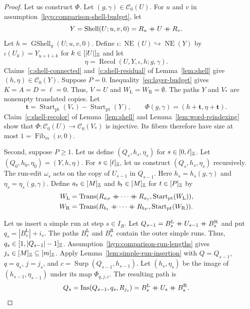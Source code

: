 \begin{proof}
 Let us construct $\Phi$.
Let $(g,\gamma)\in\mathcal C_0(U)$.
For $u$ and $v$ in assumption~\ref{hyp:comparison-shell-budget}, let
\[
 Y=\operatorname{Shell}(U;u,v,0)
 =R_u\mathbin{+\mkern-10mu+} U\mathbin{+\mkern-10mu+} R_v.
\]
Let $h=\operatorname{GShell}_{g}(U;u,v,0)$.
Define $\iota\colon\operatorname{NE}(U)\hookrightarrow\operatorname{NE}(Y)$ by
$\iota(U_k)=Y_{u+1+k}$ for $k\in[|U|]_{\mathbb Z}$ and let
\[
 \eta=\operatorname{Recol}(U,Y,\iota,h;g,\gamma).
\]
Claims~\ref{c:shell-connected} and~\ref{c:shell-residual} of Lemma~\ref{lem:shell} give $(h,\eta)\in\mathcal C_0(Y)$.
Suppose $P=0$.
Inequality~\eqref{eq:layer-budget} gives $K=A=D=\ell=0$.
Thus, $V=U$ and $W_{\mathrm L}=W_{\mathrm R}=\emptyset$.
The paths $Y$ and $V_*$ are nonempty translated copies.
Let
\[
 \mathbf t=\operatorname{Start}_{\mathrm{pt}}(V_*)-
             \operatorname{Start}_{\mathrm{pt}}(Y),\qquad
 \Phi(g,\gamma)=(h+\mathbf t,\eta+\mathbf t).
\]
Claim~\ref{c:shell-recolor} of Lemma~\ref{lem:shell} and Lemma~\ref{lem:word-reindexing}
show that $\Phi:\mathcal C_0(U)\to\mathcal C_0(V_*)$ is injective.
Its fibers therefore have size at most $1=\operatorname{Fib}_m(\nu,0)$.

Second, suppose $P\ge1$. Let us define $(Q_s,h_s,\eta_s)$ for $s\in[0,\ell]_{\mathbb Z}$.
Let $(Q_0,h_0,\eta_0)=(Y,h,\eta)$.
For $s\in[\ell]_{\mathbb Z}$, let us construct $(Q_s,h_s,\eta_s)$ recursively.
The run-edit $\omega_s$ acts on the copy of $U_{s-1}$ in $Q_{s-1}$.
Here $h_s=h_s(g,\gamma)$ and $\eta_s=\eta_s(g,\gamma)$.
Define $a_t\in[M]_{\mathbb Z}$ and $b_t\in[M]_{\mathbb Z}$ for $t\in[P]_{\mathbb Z}$ by
\[
\begin{aligned}
 W_{\mathrm L}&=\operatorname{Trans}(R_{a_P}\ccn \cdots\ccn R_{a_1},\operatorname{Start}_{\mathrm{pt}}(W_{\mathrm L})),\\
 W_{\mathrm R}&=\operatorname{Trans}(R_{b_1}\ccn \cdots\ccn R_{b_P},\operatorname{Start}_{\mathrm{pt}}(W_{\mathrm R})).
\end{aligned}
\]

Let us insert a simple run at step $s\in I_R$.
Let $Q_{s-1}=B_s^{\mathrm L}\mathbin{+\mkern-10mu+} U_{s-1}\mathbin{+\mkern-10mu+} B_s^{\mathrm R}$ and put $q_s=|B_s^{\mathrm L}|+i_s$.
The paths $B_s^{\mathrm L}$ and $B_s^{\mathrm R}$ contain the outer simple runs. Thus,
$q_s\in[1,|Q_{s-1}|-1]_{\mathbb Z}$.
Assumption~\ref{hyp:comparison-run-lengths} gives $j_s\in[M]_{\mathbb Z}\subseteq[m]_{\mathbb Z}$.
Apply Lemma~\ref{lem:simple-run-insertion} with
$Q=Q_{s-1}$, $q=q_s$, $j=j_s$, and $c=\operatorname{Surp}(Q_{s-1},h_{s-1})$.
Let $(h_s,\eta_s)$ be the image of $(h_{s-1},\eta_{s-1})$ under its map $\Phi_{q,j,c}$.
The resulting path is
\[
 Q_s=\operatorname{Ins}(Q_{s-1},q_s,R_{j_s})=B_s^{\mathrm L}\mathbin{+\mkern-10mu+} U_s\mathbin{+\mkern-10mu+} B_s^{\mathrm R}.
\]


\end{proof}
